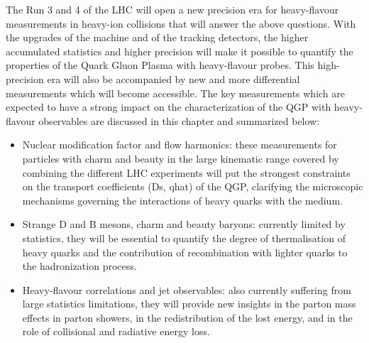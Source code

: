 The Run 3 and 4 of the LHC will open a new precision era for heavy-flavour measurements in heavy-ion collisions that will answer the above questions. 
With the upgrades of the machine and of the tracking detectors, the higher accumulated statistics and higher precision will make it possible to quantify the properties of the Quark Gluon Plasma with heavy-flavour probes. This high-precision era will also be accompanied by new and more differential measurements which will become accessible. 
The key measurements which are expected to have a strong impact on the characterization of the QGP with heavy-flavour observables are discussed in this chapter and summarized below:
\begin{itemize}
\item Nuclear modification factor and flow harmonics: these measurements for particles with charm and beauty in the large kinematic range covered by combining the different LHC experiments will put the strongest constraints on the transport coefficients (Ds, qhat) of the QGP, clarifying the microscopic mechanisms governing the interactions of heavy quarks with the medium.
\item Strange D and B mesons, charm and beauty baryons: currently limited by statistics, they will be essential to quantify the degree of thermalisation of heavy quarks and the contribution of recombination with lighter quarks to the hadronization process.
\item Heavy-flavour correlations and jet observables: also currently suffering from large statistics limitations, they will provide new insights in the parton mass effects in parton showers, in the redistribution of the lost energy, and in the role of collisional and radiative energy loss.

\end{itemize}


